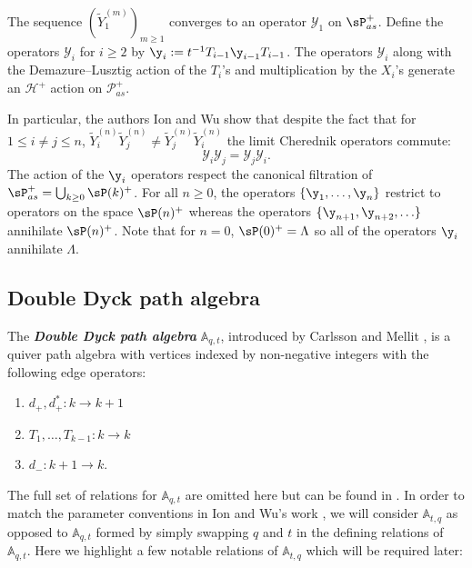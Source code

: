 \begin{thm}\label{deformed Y's converge}
    The sequence $(\widetilde{Y}_1^{(m)})_{m \geq 1}$ converges to an operator $\mathscr{Y}_1$ on $\sP_{as}^{+}$. Define the operators $\mathscr{Y}_i$ for $i \geq 2$ by $\y_{i}:= t^{-1}T_{i-1}\y_{i-1}T_{i-1}$. The operators $\mathscr{Y}_i$ along with the Demazure--Lusztig action of the $T_i$'s and multiplication by the $X_i$'s generate an $\mathscr{H}^{+}$ action on $\mathscr{P}_{as}^{+}$.
\end{thm}

In particular, the authors Ion and Wu show that despite the fact that for $1 \leq i \neq j \leq n$, $\widetilde{Y}_i^{(n)}\widetilde{Y}_j^{(n)} \neq \widetilde{Y}_j^{(n)}\widetilde{Y}_i^{(n)}$ the limit Cherednik operators commute: $$\mathscr{Y}_i\mathscr{Y}_j = \mathscr{Y}_j\mathscr{Y}_i .$$
The action of the $\y_i$ operators respect the canonical filtration of $\sP_{as}^{+} = \bigcup_{k\geq 0} \sP(k)^{+}$. For all $n\geq 0$, the operators $\{\y_1,\ldots,\y_n\}$ restrict to operators on the space $\sP(n)^{+}$ whereas the operators $\{\y_{n+1},\y_{n+2},\ldots\}$ annihilate $\sP(n)^{+}$. Note that for $n = 0$, $\sP(0)^{+} = \Lambda$ so all of the operators $\y_i$ annihilate $\Lambda$. 


\subsection{Double Dyck path algebra}
The \textbf{\textit{Double Dyck path algebra}} $\mathbb{A}_{q,t}$, introduced by Carlsson and Mellit \cite{CM_2015}, is a quiver path algebra with vertices indexed by non-negative integers with the following edge operators:
 
 \begin{center}
\begin{enumerate}
    \item $d_{+},d_{+}^{*}: k \rightarrow k+1$
    \item $T_1,\ldots,T_{k-1}: k \rightarrow k$
    \item $d_{-}: k+1 \rightarrow k.$
 \end{enumerate}
 \end{center}
 
 The full set of relations for $\mathbb{A}_{q,t}$ are omitted here but can be found in \cite{CM_2015}. In order to match the parameter conventions in Ion and Wu's work \cite{Ion_2022}, we will consider $\mathbb{A}_{t,q}$ as opposed to $\mathbb{A}_{q,t}$ formed by simply swapping $q$ and $t$ in the defining relations of $\mathbb{A}_{q,t}$. Here we highlight a few notable relations of $\mathbb{A}_{t,q}$ which will be required later:
  

